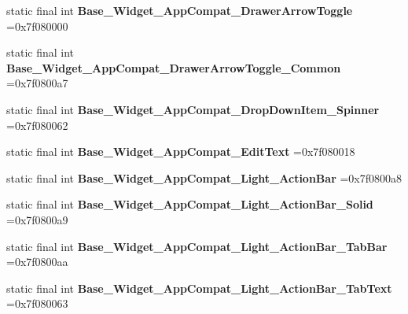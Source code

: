 \begin{DoxyCompactItemize}
\item 
\hypertarget{classcheck_1_1test_1_1_r_1_1style_a7267d1765b34fdc398374941d570f512}{}static final int {\bfseries Base\+\_\+\+Widget\+\_\+\+App\+Compat\+\_\+\+Drawer\+Arrow\+Toggle} =0x7f080000\label{classcheck_1_1test_1_1_r_1_1style_a7267d1765b34fdc398374941d570f512}

\item 
\hypertarget{classcheck_1_1test_1_1_r_1_1style_ac0189a351dbf93d5d1fb9f883f545b9b}{}static final int {\bfseries Base\+\_\+\+Widget\+\_\+\+App\+Compat\+\_\+\+Drawer\+Arrow\+Toggle\+\_\+\+Common} =0x7f0800a7\label{classcheck_1_1test_1_1_r_1_1style_ac0189a351dbf93d5d1fb9f883f545b9b}

\item 
\hypertarget{classcheck_1_1test_1_1_r_1_1style_afbb0509826fbcc42d6d8a73535e5f66a}{}static final int {\bfseries Base\+\_\+\+Widget\+\_\+\+App\+Compat\+\_\+\+Drop\+Down\+Item\+\_\+\+Spinner} =0x7f080062\label{classcheck_1_1test_1_1_r_1_1style_afbb0509826fbcc42d6d8a73535e5f66a}

\item 
\hypertarget{classcheck_1_1test_1_1_r_1_1style_a9748803a6602969a698276a4c3336425}{}static final int {\bfseries Base\+\_\+\+Widget\+\_\+\+App\+Compat\+\_\+\+Edit\+Text} =0x7f080018\label{classcheck_1_1test_1_1_r_1_1style_a9748803a6602969a698276a4c3336425}

\item 
\hypertarget{classcheck_1_1test_1_1_r_1_1style_af39ad09a0f8b16290be79889bc50f647}{}static final int {\bfseries Base\+\_\+\+Widget\+\_\+\+App\+Compat\+\_\+\+Light\+\_\+\+Action\+Bar} =0x7f0800a8\label{classcheck_1_1test_1_1_r_1_1style_af39ad09a0f8b16290be79889bc50f647}

\item 
\hypertarget{classcheck_1_1test_1_1_r_1_1style_a1a37b618775d855009856ea52517672a}{}static final int {\bfseries Base\+\_\+\+Widget\+\_\+\+App\+Compat\+\_\+\+Light\+\_\+\+Action\+Bar\+\_\+\+Solid} =0x7f0800a9\label{classcheck_1_1test_1_1_r_1_1style_a1a37b618775d855009856ea52517672a}

\item 
\hypertarget{classcheck_1_1test_1_1_r_1_1style_a3838fc7c5d63d641bb0a374e9235301f}{}static final int {\bfseries Base\+\_\+\+Widget\+\_\+\+App\+Compat\+\_\+\+Light\+\_\+\+Action\+Bar\+\_\+\+Tab\+Bar} =0x7f0800aa\label{classcheck_1_1test_1_1_r_1_1style_a3838fc7c5d63d641bb0a374e9235301f}

\item 
\hypertarget{classcheck_1_1test_1_1_r_1_1style_aa2fc59faebcb6fd42da07a29beee8e5e}{}static final int {\bfseries Base\+\_\+\+Widget\+\_\+\+App\+Compat\+\_\+\+Light\+\_\+\+Action\+Bar\+\_\+\+Tab\+Text} =0x7f080063\label{classcheck_1_1test_1_1_r_1_1style_aa2fc59faebcb6fd42da07a29beee8e5e}


\end{DoxyCompactItemize}
